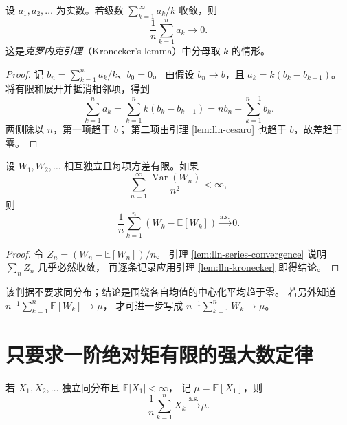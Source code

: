 \documentclass[UTF8,12pt,a4paper,fontset=fandol]{ctexart}
\begin{document}
\begin{lemma}
\label{lem:lln-kronecker}
设 $a_1,a_2,\ldots$ 为实数。若级数
$\sum_{k=1}^\infty a_k/k$ 收敛，则
\[
  \frac1n\sum_{k=1}^n a_k\longrightarrow0.
\]
这是\emph{克罗内克引理}（Kronecker's lemma）中分母取 $k$ 的情形。
\end{lemma}

\begin{proof}
记 $b_n=\sum_{k=1}^n a_k/k$、$b_0=0$。
由假设 $b_n\to b$，且 $a_k=k(b_k-b_{k-1})$。
将有限和展开并抵消相邻项，得到
\[
  \sum_{k=1}^n a_k
  =\sum_{k=1}^n k(b_k-b_{k-1})
  =nb_n-\sum_{k=1}^{n-1}b_k.
\]
两侧除以 $n$，第一项趋于 $b$；
第二项由引理 \ref{lem:lln-cesaro} 也趋于 $b$，故差趋于零。
\end{proof}

\begin{corollary}[独立变量的方差级数判据]
\label{cor:lln-kolmogorov-criterion}
设 $W_1,W_2,\ldots$ 相互独立且每项方差有限。如果
\[
  \sum_{n=1}^\infty\frac{\operatorname{Var}(W_n)}{n^2}<\infty,
\]
则
\begin{equation}
  \frac1n\sum_{k=1}^n(W_k-\mathbb E[W_k])
  \xrightarrow{\mathrm{a.s.}}0.
  \label{eq:lln-variance-series-criterion}
\end{equation}
\end{corollary}

\begin{proof}
令 $Z_n=(W_n-\mathbb E[W_n])/n$。
引理 \ref{lem:lln-series-convergence} 说明 $\sum_nZ_n$ 几乎必然收敛，
再逐条记录应用引理 \ref{lem:lln-kronecker} 即得结论。
\end{proof}

该判据不要求同分布；结论是围绕各自均值的中心化平均趋于零。
若另外知道 $n^{-1}\sum_{k=1}^n\mathbb E[W_k]\to\mu$，
才可进一步写成 $n^{-1}\sum_{k=1}^nW_k\to\mu$。

\section{只要求一阶绝对矩有限的强大数定律}
\label{sec:lln-strong-integrable}

\begin{theorem}[可积独立同分布变量的强大数定律]
\label{thm:lln-slln-integrable}
若 $X_1,X_2,\ldots$ 独立同分布且 $\mathbb E|X_1|<\infty$，
记 $\mu=\mathbb E[X_1]$，则
\begin{equation}
  \frac1n\sum_{k=1}^nX_k\xrightarrow{\mathrm{a.s.}}\mu.
  \label{eq:lln-slln-integrable}
\end{equation}
\end{theorem}
\end{document}

